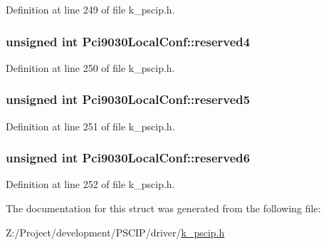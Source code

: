 Definition at line 249 of file k\_\-pscip.h.\hypertarget{struct_pci9030_local_conf_b05a13461c3fdfdfa464bd2f5814dcbc}{
\subsubsection[{reserved4}]{\setlength{\rightskip}{0pt plus 5cm}unsigned int {\bf Pci9030LocalConf::reserved4}}}
\label{struct_pci9030_local_conf_b05a13461c3fdfdfa464bd2f5814dcbc}




Definition at line 250 of file k\_\-pscip.h.\hypertarget{struct_pci9030_local_conf_f81ba16c81cdcac43a37b72ab8491d10}{
\subsubsection[{reserved5}]{\setlength{\rightskip}{0pt plus 5cm}unsigned int {\bf Pci9030LocalConf::reserved5}}}
\label{struct_pci9030_local_conf_f81ba16c81cdcac43a37b72ab8491d10}




Definition at line 251 of file k\_\-pscip.h.\hypertarget{struct_pci9030_local_conf_258eb4c536f5c5cb073b330af2059e58}{
\subsubsection[{reserved6}]{\setlength{\rightskip}{0pt plus 5cm}unsigned int {\bf Pci9030LocalConf::reserved6}}}
\label{struct_pci9030_local_conf_258eb4c536f5c5cb073b330af2059e58}




Definition at line 252 of file k\_\-pscip.h.

The documentation for this struct was generated from the following file:\begin{CompactItemize}
\item 
Z:/Project/development/PSCIP/driver/\hyperlink{k__pscip_8h}{k\_\-pscip.h}\end{CompactItemize}
